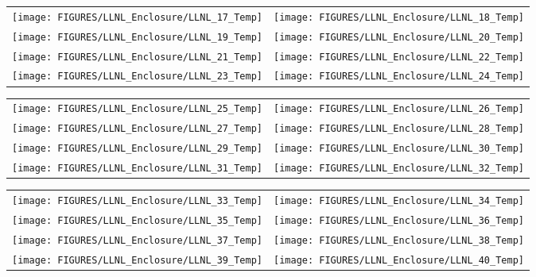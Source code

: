 \begin{figure}[p]
\begin{tabular*}{\textwidth}{l@{\extracolsep{\fill}}r}
 \texttt{[image: FIGURES/LLNL\_Enclosure/LLNL\_17\_Temp]} &
 \texttt{[image: FIGURES/LLNL\_Enclosure/LLNL\_18\_Temp]} \\
\texttt{[image: FIGURES/LLNL\_Enclosure/LLNL\_19\_Temp]} &
 \texttt{[image: FIGURES/LLNL\_Enclosure/LLNL\_20\_Temp]} \\
\texttt{[image: FIGURES/LLNL\_Enclosure/LLNL\_21\_Temp]} &
\texttt{[image: FIGURES/LLNL\_Enclosure/LLNL\_22\_Temp]} \\
\texttt{[image: FIGURES/LLNL\_Enclosure/LLNL\_23\_Temp]} &
\texttt{[image: FIGURES/LLNL\_Enclosure/LLNL\_24\_Temp]}
\end{tabular*}
\label{LLNL_Enclosure_Temp_3}
\end{figure}

\begin{figure}[p]
\begin{tabular*}{\textwidth}{l@{\extracolsep{\fill}}r}
\texttt{[image: FIGURES/LLNL\_Enclosure/LLNL\_25\_Temp]} &
\texttt{[image: FIGURES/LLNL\_Enclosure/LLNL\_26\_Temp]} \\
\texttt{[image: FIGURES/LLNL\_Enclosure/LLNL\_27\_Temp]} &
\texttt{[image: FIGURES/LLNL\_Enclosure/LLNL\_28\_Temp]} \\
\texttt{[image: FIGURES/LLNL\_Enclosure/LLNL\_29\_Temp]} &
\texttt{[image: FIGURES/LLNL\_Enclosure/LLNL\_30\_Temp]} \\
\texttt{[image: FIGURES/LLNL\_Enclosure/LLNL\_31\_Temp]} &
\texttt{[image: FIGURES/LLNL\_Enclosure/LLNL\_32\_Temp]}
\end{tabular*}
\label{LLNL_Enclosure_Temp_4}
\end{figure}

\begin{figure}[p]
\begin{tabular*}{\textwidth}{l@{\extracolsep{\fill}}r}
\texttt{[image: FIGURES/LLNL\_Enclosure/LLNL\_33\_Temp]} &
\texttt{[image: FIGURES/LLNL\_Enclosure/LLNL\_34\_Temp]} \\
\texttt{[image: FIGURES/LLNL\_Enclosure/LLNL\_35\_Temp]} &
\texttt{[image: FIGURES/LLNL\_Enclosure/LLNL\_36\_Temp]} \\
\texttt{[image: FIGURES/LLNL\_Enclosure/LLNL\_37\_Temp]} &
\texttt{[image: FIGURES/LLNL\_Enclosure/LLNL\_38\_Temp]} \\
\texttt{[image: FIGURES/LLNL\_Enclosure/LLNL\_39\_Temp]} &
\texttt{[image: FIGURES/LLNL\_Enclosure/LLNL\_40\_Temp]}
\end{tabular*}
\label{LLNL_Enclosure_Temp_5}
\end{figure}

